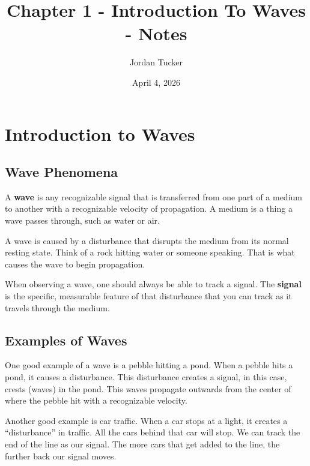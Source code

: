 \documentclass[12pt, letterpaper]{article}
\title{Chapter 1 - Introduction To Waves - Notes}
\author{Jordan Tucker}
\date{April 4, 2026}
\begin{document}
    \maketitle

    \section{Introduction to Waves}\label{sec:introduction-to-waves}

    \subsection{Wave Phenomena}\label{subsec:introduction-to-waves}
    A \textbf{wave} is any recognizable signal that is transferred from one part of a medium to another with
    a recognizable velocity of propagation.
    A medium is a thing a wave passes through, such as water
    or air.

    A wave is caused by a disturbance that disrupts the medium from its normal resting state.
    Think of a rock hitting water or someone speaking.
    That is what causes the wave to begin propagation.

    When observing a wave, one should always be able to track a signal.
    The \textbf{signal} is the specific, measurable feature of that disturbance that you can track
    as it travels through the medium.

    \subsection{Examples of Waves}\label{subsec:examples-of-waves}
    One good example of a wave is a pebble hitting a pond.
    When a pebble hits a pond, it causes a disturbance.
    This disturbance creates a signal, in this case, crests (waves) in the pond.
    This waves propagate outwards from the center of where the pebble hit with a recognizable
    velocity.

    Another good example is car traffic.
    When a car stops at a light, it creates a ``disturbance'' in traffic.
    All the cars behind that car will stop.
    We can track the end of the line as our signal.
    The more cars that get added to the line, the further back our signal moves.
\end{document}
